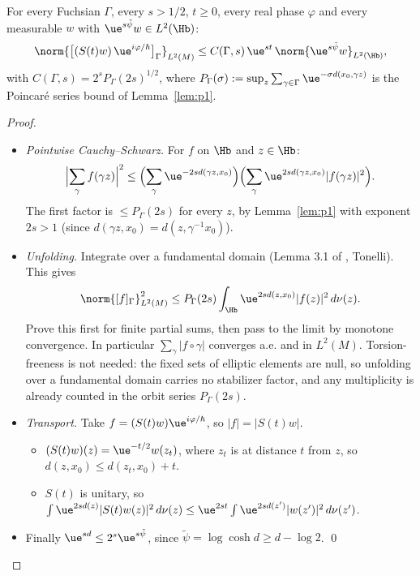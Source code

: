 \begin{lemma}[T2]\label{lem:t2}
For every Fuchsian $\Gamma$, every $s>1/2$, $t\ge0$, every real phase $\varphi$ and every measurable $w$ with $\ue^{s\tilde\psi}w\in L^2(\Hb)$:
\[
\norm{\bigl[(S(t)w)\,\ue^{i\varphi/\hbar}\bigr]_\Gamma}_{L^2(M)}\le C(\Gamma,s)\,\ue^{st}\,\norm{\ue^{s\tilde\psi}w}_{L^2(\Hb)},
\]
with $C(\Gamma,s)=2^sP_\Gamma(2s)^{1/2}$, where $P_\Gamma(\sigma):=\sup_z\sum_{\gamma\in\Gamma}\ue^{-\sigma d(x_0,\gamma z)}$ is the Poincar\'e series bound of Lemma~\ref{lem:p1}.
\end{lemma}

\begin{proof}
\begin{itemize}
\item \emph{Pointwise Cauchy--Schwarz.} For $f$ on $\Hb$ and $z\in\Hb$:
\[
\Bigl|\sum_\gamma f(\gamma z)\Bigr|^2\le\Bigl(\sum_\gamma\ue^{-2sd(\gamma z,x_0)}\Bigr)\Bigl(\sum_\gamma\ue^{2sd(\gamma z,x_0)}|f(\gamma z)|^2\Bigr).
\]
The first factor is $\le P_\Gamma(2s)$ for every $z$, by Lemma~\ref{lem:p1} with exponent $2s>1$ (since $d(\gamma z,x_0)=d(z,\gamma^{-1}x_0)$).
\item \emph{Unfolding.} Integrate over a fundamental domain (Lemma 3.1 of \cite{S}, Tonelli). This gives
\[
\norm{[f]_\Gamma}^2_{L^2(M)}\le P_\Gamma(2s)\int_\Hb\ue^{2sd(z,x_0)}|f(z)|^2\,d\nu(z).
\]
Prove this first for finite partial sums, then pass to the limit by monotone convergence. In particular $\sum_\gamma|f\circ\gamma|$ converges a.e. and in $L^2(M)$. Torsion-freeness is not needed: the fixed sets of elliptic elements are null, so unfolding over a fundamental domain carries no stabilizer factor, and any multiplicity is already counted in the orbit series $P_\Gamma(2s)$.
\item \emph{Transport.} Take $f=(S(t)w)\ue^{i\varphi/\hbar}$, so $|f|=|S(t)w|$.
  \begin{itemize}
  \item $(S(t)w)(z)=\ue^{-t/2}w(z_t)$, where $z_t$ is at distance $t$ from $z$, so $d(z,x_0)\le d(z_t,x_0)+t$.
  \item $S(t)$ is unitary, so $\int\ue^{2sd(z)}|S(t)w(z)|^2\,d\nu(z)\le\ue^{2st}\int\ue^{2sd(z')}|w(z')|^2\,d\nu(z')$.
  \end{itemize}
\item Finally $\ue^{sd}\le2^s\ue^{s\tilde\psi}$, since $\tilde\psi=\log\cosh d\ge d-\log2$. \qed
\end{itemize}
\end{proof}

